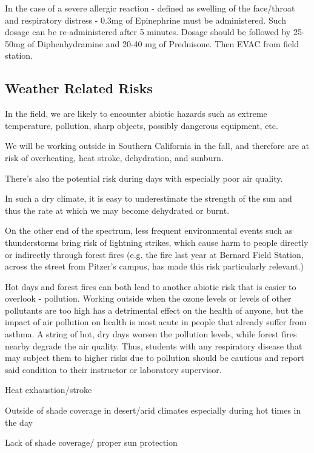 \documentclass[12pt]{../SOP2}
\begin{document}
\NP In the case of a severe allergic reaction - defined as swelling of the face/throat and respiratory distress - 0.3mg of Epinephrine must be administered. Such dosage can be re-administered after 5 minutes. Dosage should be followed by 25-50mg of Diphenhydramine and 20-40 mg of Prednisone. Then EVAC from field station. 

\subsection{Weather Related Risks}

\NP In the field, we are likely to encounter abiotic hazards such as extreme temperature, pollution, sharp objects, possibly dangerous equipment, etc. 

\NP We will be working outside in Southern California in the fall, and therefore are at risk of overheating, heat stroke, dehydration, and sunburn. 

\NP There's also the potential risk during days with especially poor air quality. 

\NP In such a dry climate, it is easy to underestimate the strength of the sun and thus the rate at which we may become dehydrated or burnt.  

\NP On the other end of the spectrum, less frequent environmental events such as thunderstorms bring risk of lightning strikes, which cause harm to people directly or indirectly through forest fires (e.g. the fire last year at Bernard Field Station, across the street from Pitzer's campus, has made this risk particularly relevant.)

\NP Hot days and forest fires can both lead to another abiotic risk that is easier to overlook - pollution. Working outside when the ozone levels or levels of other pollutants are too high has a detrimental effect on the health of anyone, but the impact of air pollution on health is most acute in people that already suffer from asthma. A string of hot, dry days worsen the pollution levels, while forest fires nearby degrade the air quality. Thus, students with any respiratory disease that may subject them to higher risks due to pollution should be cautious and report said condition to their instructor or laboratory supervisor. 

\NP Heat exhaustion/stroke

\NP Outside of shade coverage in desert/arid climates especially during hot times in the day

\NP Lack of shade coverage/ proper sun protection
\end{document}
